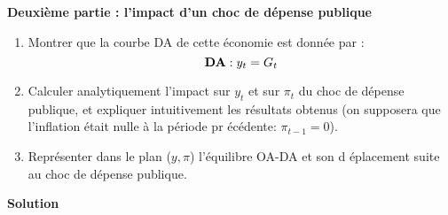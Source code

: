 \documentclass[a4paper,11pt]{article}
\begin{document}
\bigskip

\noindent \textbf{Deuxi\`{e}me partie : l'impact d'un choc de d\'{e}pense
publique}

\begin{enumerate}
\item Montrer que la courbe DA de cette \'{e}conomie est donn\'{e}e par : 
\begin{equation*}
\text{\textbf{DA}}:y_{t}=G_{t}
\end{equation*}

\item Calculer analytiquement l'impact sur $y_{t}$ et sur $\pi _{t}$ du choc
de d\'{e}pense publique, et expliquer intuitivement les r\'{e}sultats
obtenus (on supposera que l'inflation \'{e}tait nulle \`{a} la p\'{e}riode pr%
\'{e}c\'{e}dente: $\pi _{t-1}=0$).

\item Repr\'{e}senter dans le plan ($y,\pi $) l'\'{e}quilibre OA-DA et son d%
\'{e}placement suite au choc de d\'{e}pense publique.
\end{enumerate}



\bigskip
\begin{center}
\textbf{Solution}
\end{center}

\bigskip
\end{document}
